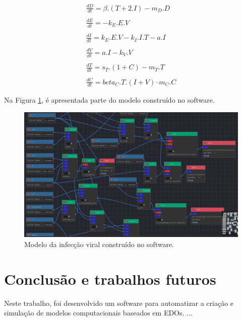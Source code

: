 \documentclass[
	12pt,				%
	openright,			%
	oneside,			%
	a4paper,			%
	main=brazil,
	english,			%
	]{ufsj-abntex2}
\begin{document}
\begin{equation}
    \begin{array}{lr}
        \frac{dD}{dt} = \beta.(T + 2.I) - m_D.D
        \\
        \\
        \frac{dE}{dt} = - k_E.E.V 
        \\
        \\
        \frac{dI}{dt} = k_E.E.V - k_I.I.T - a.I
        \\
        \\
        \frac{dV}{dt} = a.I - k_V.V
        \\
        \\
        \frac{dT}{dt} = s_T.(1+C)  - m_T.T
        \\
        \\
        \frac{dC}{dt} = beta_C.T.(I + V) – m_C.C
    \end{array}
\end{equation}

Na Figura \ref{fig:infeccaoviral}, é apresentada parte do modelo construído no software.

\begin{figure}[h]
    \centering
    \includegraphics[width=\textwidth]{imgs/modelos/infeccaoviral.png} 
    \caption{Modelo da infecção viral construído no software.}
    \label{fig:infeccaoviral}
\end{figure}

\chapter{Conclusão e trabalhos futuros}
\label{chap:conclusao}

Neste trabalho, foi desenvolvido um software para automatizar a criação e simulação de modelos computacionais baseados em EDOs. ... 
\end{document}
